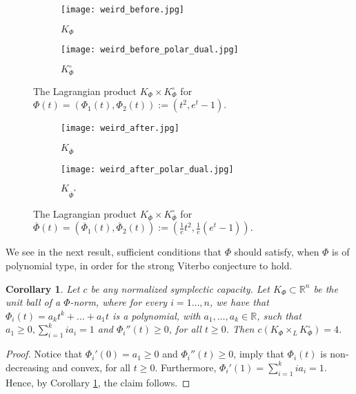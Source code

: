 \documentclass{article}
\newtheorem{cor}{Corollary}[theorem]
\theoremstyle{definition}
\begin{document}
\begin{figure}[h]
    \centering
    \begin{subfigure}{0.4\textwidth}
        \centering
        \texttt{[image: weird\_before.jpg]}
        \caption{$K_{\Phi}$}
    \end{subfigure}
    \hfill
    \begin{subfigure}{0.4\textwidth}
        \centering
        \texttt{[image: weird\_before\_polar\_dual.jpg]}
        \caption{$K_{\Phi}^{\circ}$}
    \end{subfigure}
    \caption{The Lagrangian product $K_{\Phi}\times K_{\Phi}^{\circ}$ for $\Phi(t)=(\Phi_1(t),\Phi_2(t)):=(t^2,e^t-1)$.}\label{fig: remark_before}
    
\end{figure}
\begin{figure}[h]
    \centering
    \begin{subfigure}{0.4\textwidth}
        \centering
        \texttt{[image: weird\_after.jpg]}
        \caption{$K_{\overline{\Phi}}$}
    \end{subfigure}
    \hfill
    \begin{subfigure}{0.4\textwidth}
        \centering
        \texttt{[image: weird\_after\_polar\_dual.jpg]}
        \caption{$K_{\overline{\Phi}^*}$}
    \end{subfigure}
    \caption{The Lagrangian product $K_{\overline{\Phi}}\times K_{\overline{\Phi}}^{\circ}$ for $\overline{\Phi}(t)=(\overline{\Phi}_1(t),\overline{\Phi}_2(t)):=\left(\frac{1}{e}t^2,\frac{1}{e}(e^t-1)\right)$.}\label{fig: remark_after}
    
\end{figure}

We see in the next result, sufficient conditions that $\Phi$ should satisfy, when $\Phi$ is of polynomial type, in order for the strong Viterbo conjecture to hold. 
\begin{cor}\label{cor: polynomial}
Let $c$ be any normalized symplectic capacity. Let $K_{\Phi}\subset \mathbb{R}^n$ be the unit ball of a $\Phi$-norm, where for every $i=1\ldots,n$, we have that $\Phi_i(t)=a_kt^k+\ldots+a_1t$ is a polynomial, with $a_1,\ldots, a_k\in \mathbb{R}$, such that $a_1\geq 0, \sum_{i=1}^kia_i=1$ and $\Phi_i''(t)\geq 0$, for all $t\geq 0$. Then $c(K_{\Phi}\times_L K_{\Phi}^{\circ})=4$.
\end{cor}
\begin{proof}
Notice that $\Phi_i'(0)=a_1\geq 0$ and $\Phi_i''(t)\geq 0$, imply that $\Phi_i(t)$ is non-decreasing and convex, for all $t\geq 0$. Furthermore, $\Phi_i'(1)=\sum_{i=1}^kia_i=1$. Hence, by Corollary \ref{cor: polynomial}, the claim follows.
\end{proof}
\end{document}
